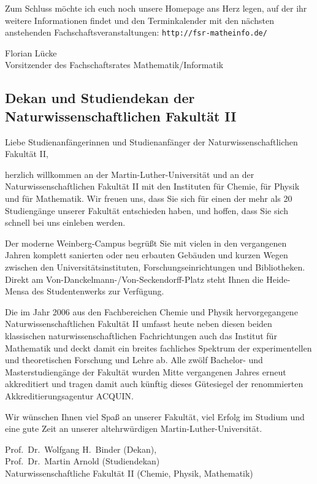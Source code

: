 Zum Schluss möchte ich euch noch unsere Homepage ans Herz legen, auf der ihr weitere Informationen findet und den Terminkalender mit den nächsten anstehenden Fachschaftsveranstaltungen: \texttt{http://fsr-matheinfo.de/}

Florian Lücke\\
Vorsitzender des Fachschaftsrates Mathematik/Informatik


\subsection{Dekan und Studiendekan der Naturwissenschaftlichen Fakultät II}

Liebe Studienanfängerinnen und Studienanfänger der Naturwissenschaftlichen
Fakultät II,

herzlich willkommen an der Martin-Luther-Universität und an der
Naturwissenschaftlichen Fakultät II mit den Instituten für Chemie, für Physik
und für Mathematik. Wir freuen uns, dass Sie sich für einen der mehr als 20
Studiengänge unserer Fakultät entschieden haben, und hoffen, dass Sie sich
schnell bei uns einleben werden.

Der moderne Weinberg-Campus begrüßt Sie mit vielen in den vergangenen Jahren
komplett sanierten oder neu erbauten Gebäuden und kurzen Wegen zwischen den
Universitätsinstituten, Forschungseinrichtungen und Bibliotheken. Direkt am
Von-Danckelmann-/Von-Seckendorff-Platz steht Ihnen die Heide-Mensa des
Studentenwerks zur Verfügung.

Die im Jahr 2006 aus den Fachbereichen Chemie und Physik hervorgegangene
Naturwissenschaftlichen Fakultät II umfasst heute neben diesen beiden
klassischen naturwissenschaftlichen Fachrichtungen auch das Institut für
Mathematik und deckt damit ein breites fachliches Spektrum der experimentellen
und theoretischen Forschung und Lehre ab. Alle zwölf Bachelor- und
Masterstudiengänge der Fakultät wurden Mitte vergangenen Jahres erneut
akkreditiert und tragen damit auch künftig dieses Gütesiegel der renommierten
Akkreditierungsagentur ACQUIN.

Wir wünschen Ihnen viel Spaß an unserer Fakultät, viel Erfolg im Studium und
eine gute Zeit an unserer altehrwürdigen Martin-Luther-Universität.

Prof.\ Dr.\ Wolfgang H.\ Binder (Dekan),\\
Prof.\ Dr.\ Martin Arnold (Studiendekan)\\
Naturwissenschaftliche Fakultät II (Chemie, Physik, Mathematik)


